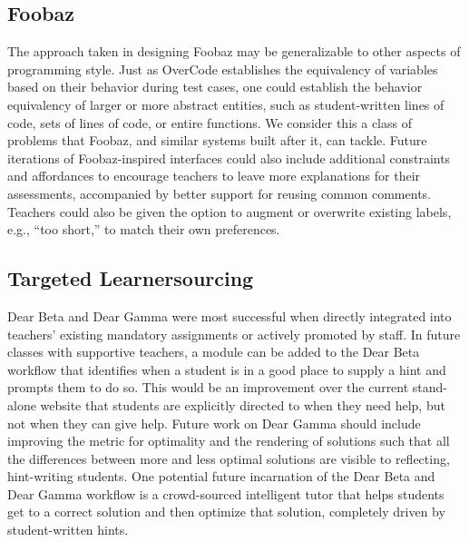\subsection{Foobaz}

The approach taken in designing Foobaz may be generalizable to other aspects of programming style. Just as OverCode establishes the equivalency of variables based on their behavior during test cases, one could establish the behavior equivalency of larger or more abstract entities, such as student-written lines of code, sets of lines of code, or entire functions. We consider this a class of problems that Foobaz, and similar systems built after it, can tackle. Future iterations of Foobaz-inspired interfaces could also include additional constraints and affordances to encourage teachers to leave more explanations for their assessments, accompanied by better support for reusing common comments. Teachers could also be given the option to augment or overwrite existing labels, e.g., ``too short,'' to match their own preferences. %

\subsection{Targeted Learnersourcing}

Dear Beta and Dear Gamma were most successful when directly integrated into teachers' existing mandatory assignments or actively promoted by staff. In future classes with supportive teachers, a module can be added to the Dear Beta workflow that identifies when a student is in a good place to supply a hint and prompts them to do so. This would be an improvement over the current stand-alone website that students are explicitly directed to when they need help, but not when they can give help. Future work on Dear Gamma should include improving the metric for optimality and the rendering of solutions such that all the differences between more and less optimal solutions are visible to reflecting, hint-writing students. One potential future incarnation of the Dear Beta and Dear Gamma workflow is a crowd-sourced intelligent tutor that helps students get to a correct solution and then optimize that solution, completely driven by student-written hints. %

